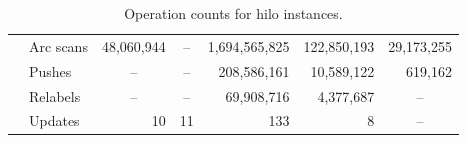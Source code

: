 \documentclass{article}
\begin{document}
\begin{table}[ht]
\begin{center}
\begin{scriptsize}
\begin{tabular}{||c|l|r|r|r|r|r||}
    &   Arc scans   &   48,060,944  &   \multicolumn{1}{|c|}{--}    &   1,694,565,825   &   122,850,193 &   29,173,255  \\
    &   Pushes  &   \multicolumn{1}{|c|}{--}    &   \multicolumn{1}{|c|}{--}    &   208,586,161 &   10,589,122  &   619,162 \\
    &   Relabels    &   \multicolumn{1}{|c|}{--}    &   \multicolumn{1}{|c|}{--}    &   69,908,716  &   4,377,687   &   \multicolumn{1}{|c||}{--}   \\
    &   Updates &   10  &   11  &   133 &   8   &   \multicolumn{1}{|c||}{--}   \\  \hline
\hline
\end{tabular}
\end{scriptsize}
\caption{\label{Table:hiloopcount}Operation counts for {\sf hilo} instances.}
\end{center}
\end{table}

\clearpage
\newpage
\end{document}
